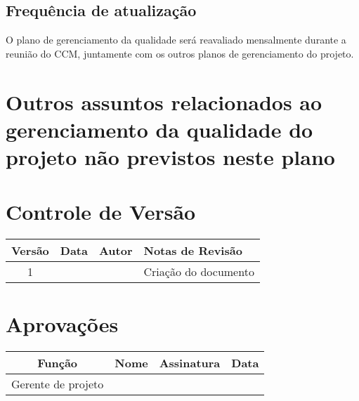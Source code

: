 \subsection{Frequência de atualização}

O plano de gerenciamento da qualidade será reavaliado mensalmente durante a reunião do CCM, juntamente com os outros planos de gerenciamento do projeto.

\section{Outros assuntos relacionados ao gerenciamento da qualidade do projeto não previstos neste plano}

\section{Controle de Versão}

\begin{table}[H]
	\begin{tabularx}{\textwidth}{| c | c | X | X |}
		\hline
		\textbf{Versão} & \textbf{Data} & \textbf{Autor}      & \textbf{Notas de Revisão} \\
		\hline
		1                &               & \projectManagerName & Criação do documento     \\
		\hline
	\end{tabularx}
	\centering
\end{table}

\section{Aprovações}

\begin{table}[H]
	\begin{tabularx}{\textwidth}{| c | c | X | c |}
		\hline
		\textbf{Função}  & \textbf{Nome}       & \textbf{Assinatura}      & \textbf{Data} \\
		\hline
		Gerente de projeto & \projectManagerName & \projectManagerSignature &               \\
		\hline
	\end{tabularx}
	\centering
\end{table}

